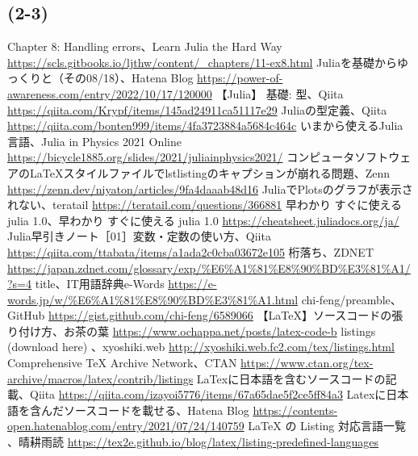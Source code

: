 \documentclass[uplatex, dvipdfmx, a4j,11pt]{jsarticle}
\begin{document}
\subsection*{(2-3)}

\begin{thebibliography}{9}
   Chapter 8: Handling errors、Learn Julia the Hard Way \url{https://scls.gitbooks.io/ljthw/content/_chapters/11-ex8.html}
   Juliaを基礎からゆっくりと（その08/18）、Hatena Blog \url{https://power-of-awareness.com/entry/2022/10/17/120000}
   【Julia】 基礎: 型、Qiita \url{https://qiita.com/Krypf/items/145ad24911ca51117e29}
   Juliaの型定義、Qiita \url{https://qiita.com/bonten999/items/4fa3723884a5684c464c}
   いまから使えるJulia言語、Julia in Physics 2021 Online \url{https://bicycle1885.org/slides/2021/juliainphysics2021/}
   コンピュータソフトウェアのLaTeXスタイルファイルでlstlistingのキャプションが崩れる問題、Zenn \url{https://zenn.dev/niyaton/articles/9fa4daaab48d16}
   JuliaでPlotsのグラフが表示されない、teratail \url{https://teratail.com/questions/366881}
   早わかり すぐに使える julia 1.0、早わかり すぐに使える julia 1.0 \url{https://cheatsheet.juliadocs.org/ja/}
   Julia早引きノート［01］変数・定数の使い方、Qiita \url{https://qiita.com/ttabata/items/a1ada2c0cba03672e105}
   桁落ち、ZDNET \url{https://japan.zdnet.com/glossary/exp/%E6%A1%81%E8%90%BD%E3%81%A1/?s=4}
   title、IT用語辞典e-Words \url{https://e-words.jp/w/%E6%A1%81%E8%90%BD%E3%81%A1.html}
   chi-feng/preamble、GitHub \url{https://gist.github.com/chi-feng/6589066}
   【LaTeX】ソースコードの張り付け方、お茶の葉 \url{https://www.ochappa.net/posts/latex-code-b}
   listings (download here) 、xyoshiki.web \url{http://xyoshiki.web.fc2.com/tex/listings.html}
   Comprehensive TeX Archive Network、CTAN \url{https://www.ctan.org/tex-archive/macros/latex/contrib/listings}
   LaTexに日本語を含むソースコードの記載、Qiita \url{https://qiita.com/izayoi5776/items/67a65dae5f2ce5ff84a3}
   Latexに日本語を含んだソースコードを載せる、Hatena Blog \url{https://contents-open.hatenablog.com/entry/2021/07/24/140759}
  LaTeX の Listing 対応言語一覧 、晴耕雨読 \url{https://tex2e.github.io/blog/latex/listing-predefined-languages}
\end{thebibliography}
\end{document}
